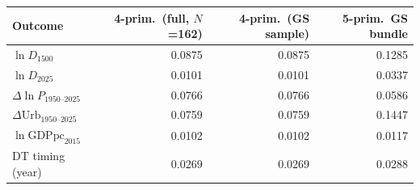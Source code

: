 \begin{tabular}{lrrr}
\toprule
Outcome & 4-prim.~(full, $N$=162) & 4-prim.~(GS sample) & 5-prim.~GS bundle\\
\midrule
$\ln D_{1500}$ & 0.0875 & 0.0875 & 0.1285\\
$\ln D_{2025}$ & 0.0101 & 0.0101 & 0.0337\\
$\Delta\ln P_{1950\text{--}2025}$ & 0.0766 & 0.0766 & 0.0586\\
$\Delta\text{Urb}_{1950\text{--}2025}$ & 0.0759 & 0.0759 & 0.1447\\
$\ln\text{GDPpc}_{2015}$ & 0.0102 & 0.0102 & 0.0117\\
DT timing (year) & 0.0269 & 0.0269 & 0.0288\\
\bottomrule
\end{tabular}

